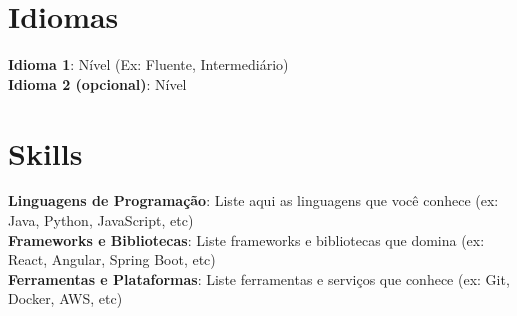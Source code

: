 \documentclass[letterpaper,11pt]{article}
\begin{document}
\section{Idiomas}
 \begin{itemize}[leftmargin=0.15in, label={}]
    \small{\item{
     \textbf{Idioma 1}{: Nível (Ex: Fluente, Intermediário)} \\
     \textbf{Idioma 2 (opcional)}{: Nível} \\
    }}
 \end{itemize}

\section{Skills}
 \begin{itemize}[leftmargin=0.15in, label={}]
    \small{\item{
     \textbf{Linguagens de Programação}{: Liste aqui as linguagens que você conhece (ex: Java, Python, JavaScript, etc)} \\
     \textbf{Frameworks e Bibliotecas}{: Liste frameworks e bibliotecas que domina (ex: React, Angular, Spring Boot, etc)} \\
     \textbf{Ferramentas e Plataformas}{: Liste ferramentas e serviços que conhece (ex: Git, Docker, AWS, etc)} }}
 \end{itemize}
\end{document}
